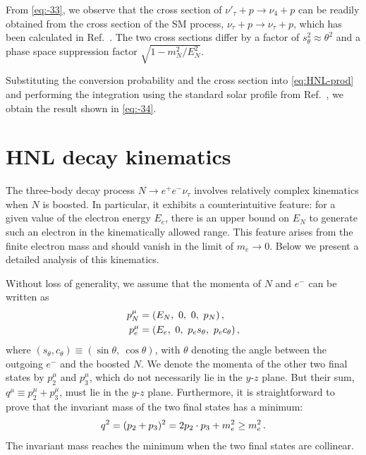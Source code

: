 \documentclass[aps,prd,twocolumn,preprintnumbers,superscriptaddress,nofootinbib]{revtex4-1}
\begin{document}
From \cref{eq:-33}, we observe that the cross section of $\nu'_{\tau}+p\to\nu{}_{4}+p$
can be readily obtained from the cross section of the SM process,
$\nu{}_{\tau}+p\to\nu_{\tau}+p$, which has been calculated in Ref.~\cite{Beacom:2002hs}.
The two cross sections differ by a factor of $s_{\theta}^{2}\approx\theta^{2}$
and a phase space suppression factor $\sqrt{1-m_{N}^{2}/E_{N}^{2}}$. 

Substituting the conversion probability and the cross section into
\cref{eq:HNL-prod} and performing the integration using the
standard solar profile from Ref.~\cite{Vinyoles:2016djt}, we obtain
the result shown in \cref{eq:-34}.

\section{HNL decay kinematics \label{sec:decay-kinematics}}

The three-body decay process $N\to e^{+}e^{-}\nu_{\tau}$ involves
relatively complex kinematics when $N$ is boosted. In particular,
it exhibits a counterintuitive feature: for a given value of the electron
energy $E_{e}$, there is an upper bound on $E_{N}$ to generate such
an electron in the kinematically allowed range. This feature arises
from the finite electron mass and should vanish in the limit of $m_{e}\to0$.
Below we present a detailed analysis of this kinematics. 

Without loss of generality, we assume that the momenta of $N$ and
$e^{-}$ can be written as 
\begin{align}
p_{N}^{\mu} & =(E_{N},\ 0,\ 0,\ p_{N})\thinspace,\label{eq:-35}\\
p_{e}^{\mu} & =(E_{e},\ 0,\ p_{e}s_{\theta},\ p_{e}c_{\theta})\thinspace,\label{eq:-36}
\end{align}
where $(s_{\theta},c_{\theta})\equiv(\sin\theta,\ \cos\theta)$, with $\theta$ denoting the angle between the outgoing $e^{-}$ and the boosted $N$.
 We denote the momenta of the other two final states by $p_{2}^{\mu}$
and $p_{3}^{\mu}$, which do not necessarily lie in the $y$-$z$
plane. But their sum, $q^{\mu}\equiv p_{2}^{\mu}+p_{3}^{\mu}$, must
lie in the $y$-$z$ plane. Furthermore, it is straightforward to
prove that the invariant mass of the two final states has a minimum:
\begin{equation}
q^{2}=(p_{2}+p_{3})^{2}=2p_{2}\cdot p_{3}+m_{e}^{2}\geq m_{e}^{2}\thinspace.\label{eq:-37}
\end{equation}
The invariant mass reaches the minimum when the two final states are
collinear. 
\end{document}
